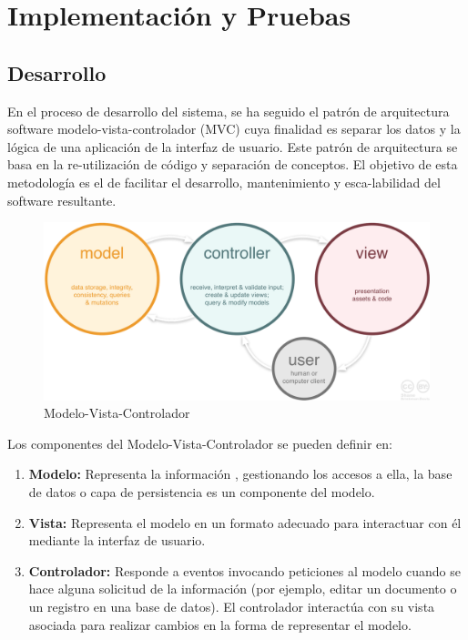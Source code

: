 \documentclass[a4paper,11pt]{book}
\begin{document}
\chapter{ Implementación y Pruebas}


\section{Desarrollo}

En el proceso de desarrollo del sistema, se ha seguido el patrón de arquitectura software modelo-vista-controlador (MVC)\cite{mvc} cuya finalidad es separar los datos y la lógica de una aplicación de la interfaz de usuario. Este patrón de arquitectura se basa en la re-utilización de código y separación de conceptos. El objetivo de esta metodología es el de facilitar el desarrollo, mantenimiento y esca-labilidad del software resultante. 

\begin{figure}[H] 
\centering 
\includegraphics[scale=0.20]{imagenes/mvc.png}
\caption{ Modelo-Vista-Controlador\cite{mvc2}  }  
\end{figure} 

Los componentes\cite{mvc3}\cite{mvc4} del Modelo-Vista-Controlador se pueden definir en:

\begin{enumerate}
\item \textbf{Modelo:} Representa la información , gestionando los accesos a ella, la base de datos  o capa de persistencia es un componente del modelo. 

\item \textbf{Vista:} Representa el modelo en un formato adecuado para interactuar con él mediante la interfaz de usuario.  

\item \textbf{Controlador:} Responde a eventos invocando peticiones al modelo cuando se hace alguna solicitud de la información (por ejemplo, editar un documento o un registro en una base de datos). El controlador interactúa con su vista asociada para realizar cambios en la forma de representar el modelo. 
\end{enumerate}
\end{document}

